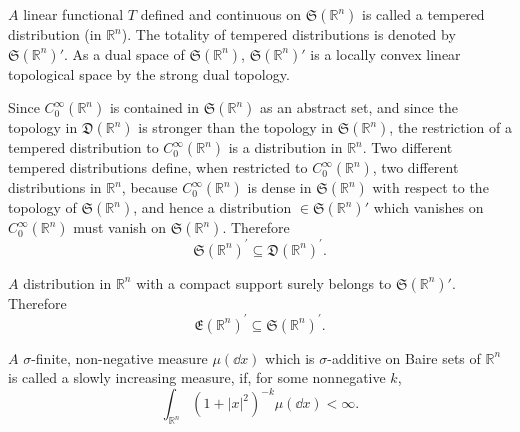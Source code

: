 \begin{definition}\label{def:VI.2.Definition.1} $A$ linear functional $T$ defined and continuous on $\mathfrak{S}(\mathbb{R}^{n})$ is called a tempered distribution (in $\mathbb{R}^{n}$). The totality of tempered distributions is denoted by $\mathfrak{S}(\mathbb{R}^{n})'$. As a dual space of $\mathfrak{S}(\mathbb{R}^{n})$, $\mathfrak{S}(\mathbb{R}^{n})'$ is a locally convex linear topological space by the strong dual topology. 
\end{definition}

\begin{proposition}\label{prop:VI.2.Proposition.1} Since $C_0^\infty(\mathbb{R}^{n})$ is contained in $\mathfrak{S}(\mathbb{R}^{n})$ as an abstract set, and since the topology in $\mathfrak{D}(\mathbb{R}^{n})$ is stronger than the topology in $\mathfrak{S}(\mathbb{R}^{n})$, the restriction of a tempered distribution to $C_0^\infty(\mathbb{R}^{n})$ is a distribution in $\mathbb{R}^{n}$. Two different tempered distributions define, when restricted to $C_0^\infty(\mathbb{R}^{n})$, two different distributions in $\mathbb{R}^{n}$, because $C_0^\infty(\mathbb{R}^{n})$ is dense in $\mathfrak{S}(\mathbb{R}^{n})$ with respect to the topology of $\mathfrak{S}(\mathbb{R}^{n})$, and hence a distribution $\in \mathfrak{S}(\mathbb{R}^{n})'$ which vanishes on $C_0^\infty(\mathbb{R}^{n})$ must vanish on $\mathfrak{S}(\mathbb{R}^{n})$. Therefore 
\begin{equation}\label{eq:VI.2.1}
\mathfrak {S} (\mathbb{R}^{n}) ^{\prime} \subseteq \mathfrak {D} (\mathbb{R}^{n}) ^{\prime}.
\end{equation}
\end{proposition}

\begin{example}\label{ex:VI.2.Example.1} $A$ distribution in $\mathbb{R}^{n}$ with a compact support surely belongs to $\mathfrak{S}(\mathbb{R}^{n})'$. Therefore 
\begin{equation}\label{eq:VI.2.2}
\mathfrak {E} (\mathbb{R}^{n}) ^{\prime} \subseteq \mathfrak {S} (\mathbb{R}^{n}) ^{\prime}.
\end{equation}
\end{example}

\begin{example}\label{ex:VI.2.Example.2} $A$ $\sigma$-finite, non-negative measure $\mu(\dd x)$ which is $\sigma$-additive on Baire sets of $\mathbb{R}^{n}$ is called a slowly increasing measure, if, for some nonnegative $k$, 
\begin{equation}\label{eq:VI.2.3}
\int_ {\mathbb{R}^{n}} (1 + | x | ^{2}) ^{-k} \mu (\dd x) < \infty .
\end{equation}
\end{example}

